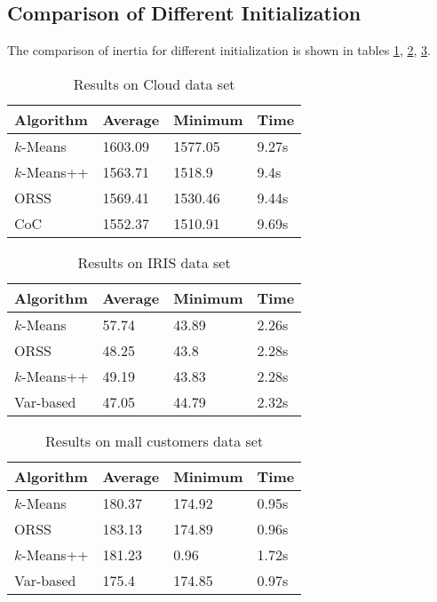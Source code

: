 \documentclass[twoside, 11pt]{article}
\begin{document}
	\subsection{Comparison of Different Initialization}
	The comparison of inertia for different initialization is shown in tables \ref{tbl:cloud}, \ref{tbl:iris}, \ref{tbl:mall}.
		\begin{table}
			\begin{center}
				\begin{tabular}{|l|l|l|l|}
					\hline
					Algorithm & Average & Minimum & Time\\\hline
					$k$-Means & 1603.09& 1577.05& 9.27s\\\hline
					$k$-Means++ & 1563.71& 1518.9& 9.4s\\\hline
					ORSS & 1569.41& 1530.46& 9.44s\\\hline
					CoC & 1552.37& 1510.91& 9.69s\\\hline
				\end{tabular}
			\caption{Results on Cloud data set}
			\label{tbl:cloud}
			\end{center}
		\end{table}
	
		\begin{table}
			\begin{center}
				\begin{tabular}{|l|l|l|l|}
					\hline
					Algorithm & Average & Minimum & Time\\\hline
					$k$-Means & 57.74& 43.89& 2.26s\\\hline
					ORSS & 48.25& 43.8& 2.28s\\\hline
					$k$-Means++ & 49.19& 43.83& 2.28s\\\hline
					Var-based & 47.05& 44.79& 2.32s\\\hline
				\end{tabular}
				\caption{Results on IRIS data set}
				\label{tbl:iris}
			\end{center}
			
		\end{table}

		\begin{table}
			\begin{center}
				\begin{tabular}{|l|l|l|l|}
					\hline
					Algorithm & Average & Minimum & Time\\\hline
					$k$-Means & 180.37& 174.92& 0.95s\\\hline
					ORSS & 183.13& 174.89& 0.96s\\\hline
					$k$-Means++ & 181.23& 0.96& 1.72s\\\hline
					Var-based & 175.4& 174.85& 0.97s\\\hline
				\end{tabular}
				\caption{Results on mall customers data set}
				\label{tbl:mall}
			\end{center}
			
		\end{table}
\end{document}
